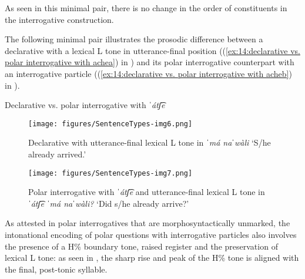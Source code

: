 As seen in this minimal pair, there is no change in the order of constituents in the interrogative construction.

The following minimal pair illustrates the prosodic difference between a declarative with a lexical L tone in utterance-final position ((\ref{ex:14:declarative vs. polar interrogative with achea}) in ) and its polar interrogative counterpart with an interrogative particle ((\ref{ex:14:declarative vs. polar interrogative with acheb}) in ).

\ea\label{ex:14:declarative vs. polar interrogative ache}
{Declarative vs. polar interrogative with \textit{ˈátʃ͡e}}


    \z
\z

\begin{figure}
\texttt{[image: figures/SentenceTypes-img6.png]}
\caption{
\label{fig: declarative with L tone}
Declarative with utterance-final lexical L tone in \textit{ˈmá naˈwàli} `S/he already arrived.' }
\end{figure}

\begin{figure}
\texttt{[image: figures/SentenceTypes-img7.png]}
\caption{
\label{fig: polar interrogative with ache lexical L  tone}
Polar interrogative with \textit{ˈátʃ͡e} and utterance-final lexical L tone in \textit{ˈátʃ͡e ˈmá naˈwàli?} `Did s/he already arrive?' }
\end{figure}

As attested in polar interrogatives that are morphosyntactically unmarked, the intonational encoding of polar questions with interrogative particles also involves the presence of a H\% boundary tone, raised register and the preservation of lexical L tone: as seen in , the sharp rise and peak of the H\% tone is aligned with the final, post-tonic syllable.

